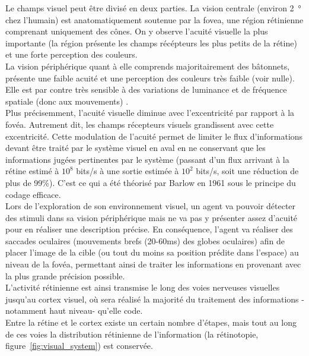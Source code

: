 Le champs visuel peut être divisé en deux parties. La vision centrale (environ \SI{2}{\degree} chez l'humain) est anatomatiquement soutenue par la fovea, une région rétinienne comprenant uniquement des cônes. On y observe l'acuité visuelle la plus importante (la région présente les champs récépteurs les plus petits de la rétine) et une forte perception des couleurs.\autocite{Werner2014}\\
La vision périphérique quant à elle comprends majoritairement des bâtonnets, présente une faible acuité et une perception des couleurs très faible (voir nulle). Elle est par contre très sensible à des variations de luminance et de fréquence spatiale (donc aux mouvements) \autocite{Werner2014}.\\
 Plus précisemment, l'acuité visuelle diminue avec l'excentricité par rapport à la fovéa. Autrement dit, les champs récepteurs visuels grandissent avec cette excentricité. Cette modulation de l'acuité permet de limiter le flux d'informations devant être traité par le système visuel en aval en ne conservant que les informations jugées pertinentes par le système (passant d'un flux arrivant à la rétine estimé à $10^8$ bits/s à une sortie estimée à $10^2$ bits/s, soit une réduction de plus de 99\%). C'est ce qui a été théorisé par Barlow en 1961 sous le principe du codage efficace. \autocite{Kortum1996, Zhaoping2014, Werner2014, Itti2000}\\
Lors de l'exploration de son environnement visuel, un agent va pouvoir détecter des stimuli dans sa vision périphérique mais ne va pas y présenter assez d'acuité pour en réaliser une description précise.
En conséquence, l'agent va réaliser des saccades oculaires (mouvements brefs (20-60\si{\milli\second}) des globes oculaires) afin de placer l'image de la cible (ou tout du moins sa position prédite dans l'espace) au niveau de la fovéa, permettant ainsi de traiter les informations en provenant avec la plus grande précision possible.\autocite{Kortum1996, Werner2014}\\

L'activité rétinienne est ainsi transmise le long des voies nerveuses visuelles jusqu'au cortex visuel, où sera réalisé la majorité du traitement des informations -notamment haut niveau- qu'elle code.\autocite{Werner2014} \\
Entre la rétine et le cortex existe un certain nombre d'étapes, mais tout au long de ces voies la distribution rétinienne de l'information (la rétinotopie, figure~\ref{fig:visual_system}) est conservée.\autocite{Werner2014}\\

